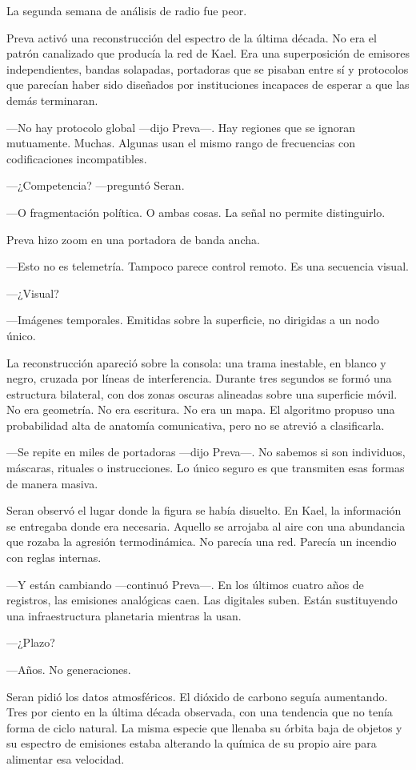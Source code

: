 \documentclass[11pt,a5paper,twoside]{book}
\begin{document}
La segunda semana de análisis de radio fue peor.

Preva activó una reconstrucción del espectro de la última década. No era el patrón canalizado que producía la red de Kael. Era una superposición de emisores independientes, bandas solapadas, portadoras que se pisaban entre sí y protocolos que parecían haber sido diseñados por instituciones incapaces de esperar a que las demás terminaran.

—No hay protocolo global —dijo Preva—. Hay regiones que se ignoran mutuamente. Muchas. Algunas usan el mismo rango de frecuencias con codificaciones incompatibles.

—¿Competencia? —preguntó Seran.

—O fragmentación política. O ambas cosas. La señal no permite distinguirlo.

Preva hizo zoom en una portadora de banda ancha.

—Esto no es telemetría. Tampoco parece control remoto. Es una secuencia visual.

—¿Visual?

—Imágenes temporales. Emitidas sobre la superficie, no dirigidas a un nodo único.

La reconstrucción apareció sobre la consola: una trama inestable, en blanco y negro, cruzada por líneas de interferencia. Durante tres segundos se formó una estructura bilateral, con dos zonas oscuras alineadas sobre una superficie móvil. No era geometría. No era escritura. No era un mapa. El algoritmo propuso una probabilidad alta de anatomía comunicativa, pero no se atrevió a clasificarla.

—Se repite en miles de portadoras —dijo Preva—. No sabemos si son individuos, máscaras, rituales o instrucciones. Lo único seguro es que transmiten esas formas de manera masiva.

Seran observó el lugar donde la figura se había disuelto. En Kael, la información se entregaba donde era necesaria. Aquello se arrojaba al aire con una abundancia que rozaba la agresión termodinámica. No parecía una red. Parecía un incendio con reglas internas.

—Y están cambiando —continuó Preva—. En los últimos cuatro años de registros, las emisiones analógicas caen. Las digitales suben. Están sustituyendo una infraestructura planetaria mientras la usan.

—¿Plazo?

—Años. No generaciones.

Seran pidió los datos atmosféricos. El dióxido de carbono seguía aumentando. Tres por ciento en la última década observada, con una tendencia que no tenía forma de ciclo natural. La misma especie que llenaba su órbita baja de objetos y su espectro de emisiones estaba alterando la química de su propio aire para alimentar esa velocidad.
\end{document}
